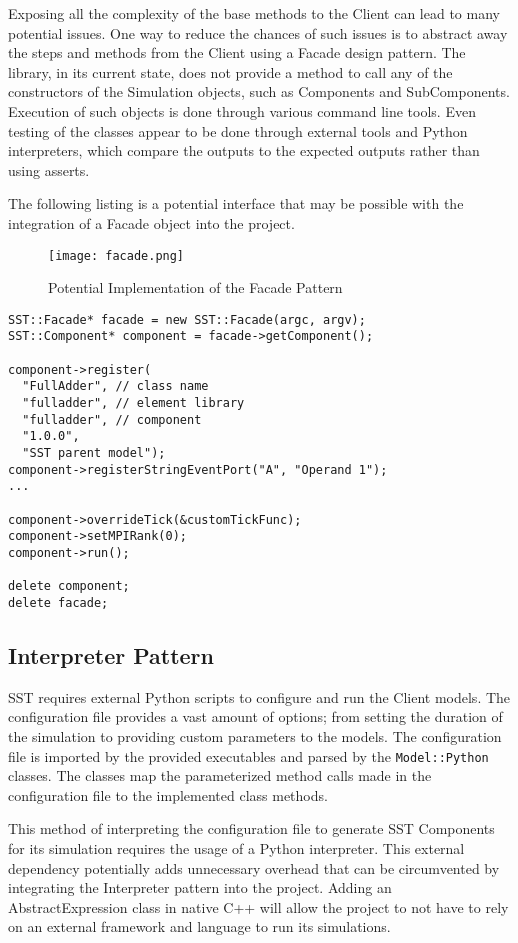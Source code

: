 Exposing all the complexity of the base methods to the Client can lead to many potential issues. One way to reduce the chances of such issues is to abstract away the steps and methods from the Client using a Facade design pattern. The library, in its current state, does not provide a method to call any of the constructors of the Simulation objects, such as Components and SubComponents. Execution of such objects is done through various command line tools. Even testing of the classes appear to be done through external tools and Python interpreters, which compare the outputs to the expected outputs rather than using asserts.

The following listing is a potential interface that may be possible with the integration of a Facade object into the project.

\begin{figure}[h]
  \caption{Potential Implementation of the Facade Pattern}
  \centering
  \texttt{[image: facade.png]}
\end{figure}

\begin{lstlisting}[style=customC++,label=facade,caption=Potential Implementation of Facade]
SST::Facade* facade = new SST::Facade(argc, argv);
SST::Component* component = facade->getComponent();

component->register(
  "FullAdder", // class name
  "fulladder", // element library
  "fulladder", // component
  "1.0.0",
  "SST parent model");
component->registerStringEventPort("A", "Operand 1");
...

component->overrideTick(&customTickFunc);
component->setMPIRank(0);
component->run();

delete component;
delete facade;
\end{lstlisting}

\newpage
\subsection{Interpreter Pattern}
SST requires external Python scripts to configure and run the Client models. The configuration file provides a vast amount of options; from setting the duration of the simulation to providing custom parameters to the models. The configuration file is imported by the provided executables and parsed by the \texttt{Model::Python} classes. The classes map the parameterized method calls made in the configuration file to the implemented class methods.

This method of interpreting the configuration file to generate SST Components for its simulation requires the usage of a Python interpreter. This external dependency potentially adds unnecessary overhead that can be circumvented by integrating the Interpreter pattern into the project. Adding an AbstractExpression class in native C++ will allow the project to not have to rely on an external framework and language to run its simulations.


